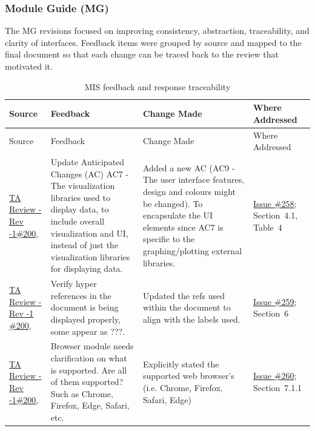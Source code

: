 \documentclass{article}
\begin{document}
\subsubsection{Module Guide (MG)}\label{ssubsec:mg-trace}

The MG revisions focused on improving consistency, abstraction,
traceability, and clarity of interfaces. Feedback items were grouped
by source and mapped to the final document so that each change can be
traced back to the review that motivated it.

\begin{longtable}{p{} p{}
                  p{} p{}}
\caption{MIS feedback and response traceability}
\label{tab:mg-trace}\\
\toprule
Source & Feedback & Change Made & Where Addressed \\
\midrule
\endfirsthead

\toprule
Source & Feedback & Change Made & Where Addressed \\
\midrule
\endhead

\bottomrule
\endfoot

\href{https://github.com/thaafei/DomainX/issues/200}{TA Review - Rev -1\#200},
&
Update Anticipated Changes (AC) AC7 - The visualization libraries used to display data,  to include overall visualization and UI, instead of just the visualization libraries for displaying data.
&
Added a new AC (AC9 - The user interface features, design and colours might be changed). To encapsulate the UI elements since AC7 is specific to the graphing/plotting external libraries.
&
\href{https://github.com/thaafei/DomainX/issues/258}{Issue \#258}; Section~4.1, Table~4
\\

\href{https://github.com/thaafei/DomainX/issues/200}{TA Review - Rev -1 \#200},&
Verify hyper references in the document is being displayed properly, some appear as ???.
&
Updated the refs used within the document to align with the labels used.
&
\href{https://github.com/thaafei/DomainX/issues/259}{Issue \#259}; Section~6
\\

\href{https://github.com/thaafei/DomainX/issues/200}{TA Review - Rev -1\#200},&
Browser module needs clarification on what is supported. Are all of them supported? Such as Chrome, Firefox, Edge, Safari, etc.
&
Explicitly stated the supported web browser's (i.e. Chrome, Firefox, Safari, Edge)
&
\href{https://github.com/thaafei/DomainX/issues/260}{Issue \#260}; Section~7.1.1
\\


\end{longtable}
\end{document}
